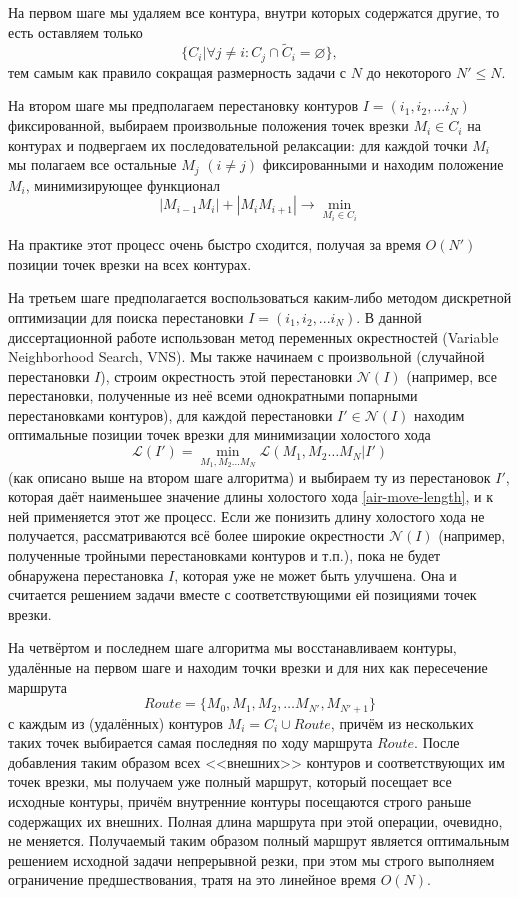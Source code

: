 На первом шаге мы удаляем все контура,
внутри которых содержатся другие, 
то есть оставляем только
$$
\{C_i | \forall j \ne i: C_j \cap \widetilde C_i = \varnothing \},
$$
тем самым как правило сокращая размерность задачи с $N$
до некоторого $N' \leqslant N$.

На втором шаге мы предполагаем перестановку контуров 
$I = (i_1, i_2, ... i_N)$
фиксированной,
выбираем произвольные положения точек врезки
$M_i \in C_i$ на контурах и подвергаем их последовательной релаксации:
для каждой точки $M_i$
мы полагаем все остальные $M_j$ $(i\ne j)$ фиксированными и находим
положение $M_i$, минимизирующее функционал
$$
|M_{i-1}M_i|+|M_iM_{i+1}| \to \min_{M_i \in C_i}
$$

На практике этот процесс очень быстро сходится,
получая за время $O(N')$
позиции точек врезки на всех контурах.

На третьем шаге предполагается воспользоваться каким-либо
методом дискретной оптимизации для поиска перестановки
$I = (i_1, i_2, ... i_N)$.
В данной диссертационной работе использован метод
переменных окрестностей
(Variable Neighborhood Search,
VNS).
Мы также начинаем с произвольной
(случайной перестановки $I$),
строим окрестность этой перестановки 
$\mathcal N(I)$
(например, все перестановки,
полученные из неё всеми однократными попарными перестановками контуров),
для каждой перестановки $I'\in \mathcal N(I)$
находим оптимальные позиции точек врезки 
для минимизации холостого хода 
$$
\mathcal L (I') = \min_{M_1, M_2 \dots M_N}
  \mathcal L (M_1, M_2 \dots M_N | I')
$$
(как описано выше на втором шаге алгоритма)
и выбираем ту из перестановок $I'$,
которая даёт наименьшее значение длины 
холостого хода \eqref{air-move-length},
и к ней применяется этот же процесс.
Если же понизить длину холостого хода не получается,
рассматриваются всё более широкие окрестности 
$\mathcal N(I)$
(например, полученные тройными перестановками контуров
и т.п.), 
пока не будет обнаружена перестановка $I$,
которая уже не может быть улучшена.
Она и считается решением задачи
вместе с соответствующими ей позициями точек врезки.

На четвёртом и последнем шаге алгоритма
мы восстанавливаем контуры,
удалённые на первом шаге и находим точки
врезки и для них как пересечение маршрута
\begin{equation}
  \label{route0}
  Route = \{ M_0, M_1, M_2, \dots M_{N'}, M_{N'+1}\}
\end{equation}
с каждым из (удалённых) контуров
$M_i = C_i \cup Route$,
причём из нескольких таких точек
выбирается самая последняя по ходу маршрута
$Route$.
После добавления таким образом всех
<<внешних>> контуров
и соответствующих им точек врезки,
мы получаем уже полный маршрут,
который посещает все исходные контуры,
причём внутренние контуры посещаются
строго раньше содержащих их внешних.
Полная длина маршрута
при этой операции,
очевидно,
не меняется.
Получаемый таким образом полный маршрут
является оптимальным решением исходной задачи
непрерывной резки,
при этом
мы строго выполняем
ограничение предшествования,
тратя на это линейное время
$O(N)$.
